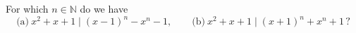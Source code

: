 For which $n \in \mathbb{N}$ do we have
\[ \text{(a)}\ x^2 + x + 1 \mid (x - 1)^n - x^n - 1,\qquad \text{(b)}\ x^2 + x + 1 \mid (x + 1)^n + x^n + 1\,? \]
